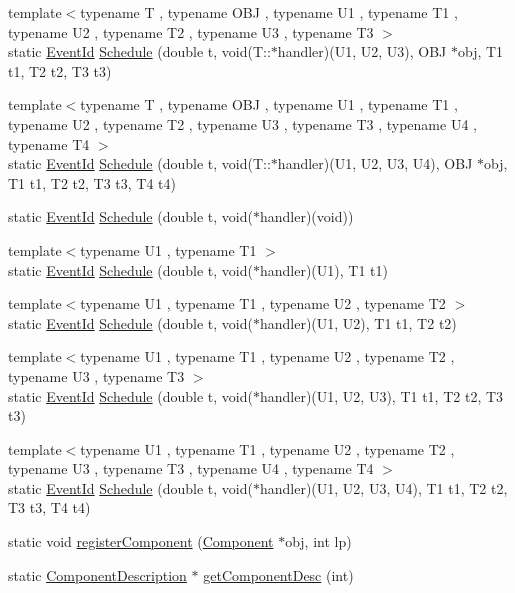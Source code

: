 \begin{CompactItemize}
\item 
{\footnotesize template$<$typename T , typename OBJ , typename U1 , typename T1 , typename U2 , typename T2 , typename U3 , typename T3 $>$ }\\static \hyperlink{classEventId}{EventId} \hyperlink{classSimulator_f4102ccb431eea8143497cb92fb499d4}{Schedule} (double t, void(T::$\ast$handler)(U1, U2, U3), OBJ $\ast$obj, T1 t1, T2 t2, T3 t3)
\item 
{\footnotesize template$<$typename T , typename OBJ , typename U1 , typename T1 , typename U2 , typename T2 , typename U3 , typename T3 , typename U4 , typename T4 $>$ }\\static \hyperlink{classEventId}{EventId} \hyperlink{classSimulator_6846b3f0aa16ad7b4a4a1653837c123a}{Schedule} (double t, void(T::$\ast$handler)(U1, U2, U3, U4), OBJ $\ast$obj, T1 t1, T2 t2, T3 t3, T4 t4)
\item 
static \hyperlink{classEventId}{EventId} \hyperlink{classSimulator_e5e8a4479b8e2a7b4ecdb3eb8561b960}{Schedule} (double t, void($\ast$handler)(void))
\item 
{\footnotesize template$<$typename U1 , typename T1 $>$ }\\static \hyperlink{classEventId}{EventId} \hyperlink{classSimulator_e76c104f5cfd844df6054a3c7956a098}{Schedule} (double t, void($\ast$handler)(U1), T1 t1)
\item 
{\footnotesize template$<$typename U1 , typename T1 , typename U2 , typename T2 $>$ }\\static \hyperlink{classEventId}{EventId} \hyperlink{classSimulator_612e0d3f87f3461aa116ca3552adf11a}{Schedule} (double t, void($\ast$handler)(U1, U2), T1 t1, T2 t2)
\item 
{\footnotesize template$<$typename U1 , typename T1 , typename U2 , typename T2 , typename U3 , typename T3 $>$ }\\static \hyperlink{classEventId}{EventId} \hyperlink{classSimulator_2bc6f517e3b3a284b6b52efc47a9da76}{Schedule} (double t, void($\ast$handler)(U1, U2, U3), T1 t1, T2 t2, T3 t3)
\item 
{\footnotesize template$<$typename U1 , typename T1 , typename U2 , typename T2 , typename U3 , typename T3 , typename U4 , typename T4 $>$ }\\static \hyperlink{classEventId}{EventId} \hyperlink{classSimulator_a94a8a5c64b661ad4607517d84c8832e}{Schedule} (double t, void($\ast$handler)(U1, U2, U3, U4), T1 t1, T2 t2, T3 t3, T4 t4)
\item 
static void \hyperlink{classSimulator_bc27a87849e9903771b3990c99c750bd}{registerComponent} (\hyperlink{classComponent}{Component} $\ast$obj, int lp)
\item 
static \hyperlink{classComponentDescription}{ComponentDescription} $\ast$ \hyperlink{classSimulator_664a4bdb8925e0251e94131192743ff2}{getComponentDesc} (int)
\end{CompactItemize}


